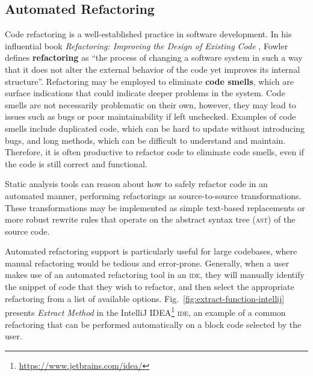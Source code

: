 \subsection{Automated Refactoring}
Code refactoring is a well-established practice in software development.
In his influential book \textit{Refactoring: Improving the Design of Existing Code} \cite{fowler_refactoring_2018}, Fowler defines \textbf{refactoring} as ``the process of changing a software system in such a way that it does not alter the external behavior of the code yet improves its internal structure''.
Refactoring may be employed to eliminate \textbf{code smells}, which are surface indications that could indicate deeper problems in the system.
Code smells are not necessarily problematic on their own, however, they may lead to issues such as bugs or poor maintainability if left unchecked.
Examples of code smells include duplicated code, which can be hard to update without introducing bugs, and long methods, which can be difficult to understand and maintain.
Therefore, it is often productive to refactor code to eliminate code smells, even if the code is still correct and functional.

Static analysis tools can reason about how to safely refactor code in an automated manner, performing refactorings as source-to-source transformations.
These transformations may be implemented as simple text-based replacements or more robust rewrite rules that operate on the abstract syntax tree (\textsc{ast}) of the source code.

Automated refactoring support is particularly useful for large codebases, where manual refactoring would be tedious and error-prone.
Generally, when a user makes use of an automated refactoring tool in an \textsc{ide}, they will manually identify the snippet of code that they wish to refactor, and then select the appropriate refactoring from a list of available options.
Fig.~\ref{fig:extract-function-intellij} presents \textit{Extract Method} \cite{fowler_refactoring_2018} in the IntelliJ IDEA\footnote{\url{https://www.jetbrains.com/idea/}} \textsc{ide}, an example of a common refactoring that can be performed automatically on a block code selected by the user.

